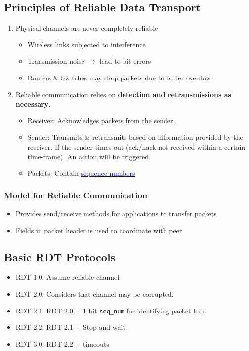\documentclass[a4paper]{article}
\begin{document}
\subsection{Principles of Reliable Data Transport}
\begin{enumerate}
    \item Physical channels are never completely reliable
    \begin{itemize}[label=$\circ$]
        \item Wireless links subjected to interference
        \item Transmission noise $\rightarrow$ lead to bit errors
        \item Routers \& Switches may drop packets due to buffer overflow
    \end{itemize}
    \item Reliable communication relies on \textbf{detection and retransmissions as necessary}.
    \begin{itemize}[label=$\circ$]
        \item Receiver: Acknowledges packets from the sender.
        \item Sender: Transmits \& retransmits based on information provided by the receiver. If the sender times out (ack/nack not received within a certain time-frame). An action will be triggered.
        \item Packets: Contain \hyperref[seqnum]{\textcolor{blue}{sequence numbers}}
    \end{itemize}
\end{enumerate}

\subsubsection{Model for Reliable Communication}
\begin{itemize}
    \item Provides send/receive methods for applications to transfer packets
    \item Fields in packet header is used to coordinate with peer
\end{itemize}

\subsection{Basic RDT Protocols}
\begin{itemize}
    \item RDT 1.0: Assume reliable channel
    \item RDT 2.0: Considers that channel may be corrupted.
    \item RDT 2.1: RDT 2.0 + 1-bit \texttt{seq\_num} for identifying packet loss.
    \item RDT 2.2: RDT 2.1 + Stop and wait.
    \item RDT 3.0: RDT 2.2 + timeouts
\end{itemize}
\end{document}
